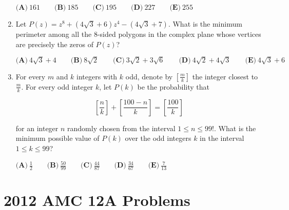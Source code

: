 \documentclass{article}
\begin{document}
\begin{enumerate}[label=\arabic*., itemsep=0.5em]
\(\textbf{(A)}\ 161 \qquad \textbf{(B)}\ 185 \qquad \textbf{(C)}\  195 \qquad \textbf{(D)}\  227 \qquad \textbf{(E)}\  255\)\par \vspace{0.5em}\item Let \(P(z) = z^8 + \left(4\sqrt{3} + 6\right)z^4 - \left(4\sqrt{3} + 7\right)\). What is the minimum perimeter among all the \(8\)-sided polygons in the complex plane whose vertices are precisely the zeros of \(P(z)\)?

\(\textbf{(A)}\ 4\sqrt{3} + 4 \qquad \textbf{(B)}\ 8\sqrt{2} \qquad \textbf{(C)}\  3\sqrt{2} + 3\sqrt{6} \qquad \textbf{(D)}\  4\sqrt{2} + 4\sqrt{3} \qquad \textbf{(E)}\  4\sqrt{3} + 6\)\par \vspace{0.5em}\item For every \(m\) and \(k\) integers with \(k\) odd, denote by \(\left[\frac{m}{k}\right]\) the integer closest to \(\frac{m}{k}\). For every odd integer \(k\), let \(P(k)\) be the probability that


\begin{equation*}
\left[\frac{n}{k}\right] + \left[\frac{100 - n}{k}\right] = \left[\frac{100}{k}\right]
\end{equation*}


for an integer \(n\) randomly chosen from the interval \(1 \leq n \leq 99!\). What is the minimum possible value of \(P(k)\) over the odd integers \(k\) in the interval \(1 \leq k \leq 99\)?

\(\textbf{(A)}\ \frac{1}{2} \qquad \textbf{(B)}\ \frac{50}{99} \qquad \textbf{(C)}\ \frac{44}{87} \qquad \textbf{(D)}\  \frac{34}{67} \qquad \textbf{(E)}\  \frac{7}{13}\)\par \vspace{0.5em}\end{enumerate}\newpage\section*{2012 AMC 12A Problems}
\end{document}
